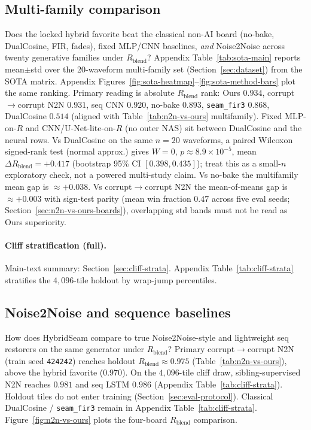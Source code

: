 \subsection{Multi-family comparison}
\label{sec:sota-main}

Does the locked hybrid favorite beat the classical non-AI board (no-bake, DualCosine, FIR, fades),
fixed MLP/CNN baselines, \emph{and} Noise2Noise across twenty generative families under $R_{\mathrm{blend}}$?
Appendix Table~\ref{tab:sota-main} reports mean$\pm$std over the 20-waveform multi-family set (Section~\ref{sec:dataset}) from the SOTA matrix.
Appendix Figures~\ref{fig:sota-heatmap}--\ref{fig:sota-method-bars} plot the same ranking.
Primary reading is absolute $R_{\mathrm{blend}}$ rank:
Ours $0.934$, corrupt$\to$corrupt N2N $0.931$, seq CNN $0.920$, no-bake $0.893$,
\texttt{seam\_fir3} $0.868$, DualCosine $0.514$
(aligned with Table~\ref{tab:n2n-vs-ours} multifamily).
Fixed MLP-on-$R$ and CNN/U-Net-lite-on-$R$ (no outer NAS) sit between DualCosine and the neural rows.
Vs DualCosine on the same $n{=}20$ waveforms, a paired Wilcoxon signed-rank test (normal approx.) gives $W{=}0$, $p{\approx}8.9{\times}10^{-5}$, mean $\Delta R_{\mathrm{blend}}{=}{+}0.417$ (bootstrap 95\% CI $[0.398,0.435]$); treat this as a small-$n$ exploratory check, not a powered multi-study claim.
Vs no-bake the multifamily mean gap is $\approx{+}0.038$.
Vs corrupt$\to$corrupt N2N the mean-of-means gap is $\approx{+}0.003$ with sign-test parity (mean win fraction $0.47$ across five eval seeds; Section~\ref{sec:n2n-vs-ours-boards}), overlapping std bands must not be read as Ours superiority.

\paragraph{Cliff stratification (full).}
Main-text summary: Section~\ref{sec:cliff-strata}.
Appendix Table~\ref{tab:cliff-strata} stratifies the $4{,}096$-tile holdout by wrap-jump percentiles.

\subsection{Noise2Noise and sequence baselines}
\label{sec:n2n-baselines}

How does HybridSeam compare to true Noise2Noise-style and lightweight seq restorers on the same generator under $R_{\mathrm{blend}}$?
Primary corrupt$\to$corrupt N2N (train seed \texttt{424242}) reaches holdout $R_{\mathrm{blend}}\approx 0.975$ (Table~\ref{tab:n2n-vs-ours}), above the hybrid favorite ($0.970$).
On the $4{,}096$-tile cliff draw, sibling-supervised N2N reaches $0.981$ and seq LSTM $0.986$ (Appendix Table~\ref{tab:cliff-strata}).
Holdout tiles do not enter training (Section~\ref{sec:eval-protocol}).
Classical DualCosine / \texttt{seam\_fir3} remain in Appendix Table~\ref{tab:cliff-strata}.
Figure~\ref{fig:n2n-vs-ours} plots the four-board $R_{\mathrm{blend}}$ comparison.

